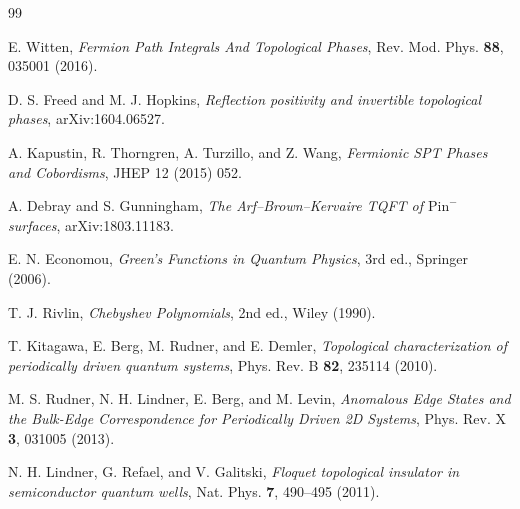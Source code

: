 \documentclass[aps,prb,twocolumn,superscriptaddress,nofootinbib,10pt]{revtex4-2}
\theoremstyle{definition}
\theoremstyle{remark}
\newcommand{\Pin}{\mathrm{Pin}}
\begin{document}

\begin{thebibliography}{99}

E. Witten, \emph{Fermion Path Integrals And Topological Phases}, Rev. Mod. Phys. \textbf{88}, 035001 (2016).

D. S. Freed and M. J. Hopkins, \emph{Reflection positivity and invertible topological phases}, arXiv:1604.06527.

A. Kapustin, R. Thorngren, A. Turzillo, and Z. Wang, \emph{Fermionic SPT Phases and Cobordisms}, JHEP 12 (2015) 052.

A. Debray and S. Gunningham, \emph{The Arf--Brown--Kervaire TQFT of $\Pin^{-}$ surfaces}, arXiv:1803.11183.

E. N. Economou, \emph{Green's Functions in Quantum Physics}, 3rd ed., Springer (2006).

T. J. Rivlin, \emph{Chebyshev Polynomials}, 2nd ed., Wiley (1990).

T. Kitagawa, E. Berg, M. Rudner, and E. Demler, \emph{Topological characterization of periodically driven quantum systems}, Phys. Rev. B \textbf{82}, 235114 (2010).

M. S. Rudner, N. H. Lindner, E. Berg, and M. Levin, \emph{Anomalous Edge States and the Bulk-Edge Correspondence for Periodically Driven 2D Systems}, Phys. Rev. X \textbf{3}, 031005 (2013).

N. H. Lindner, G. Refael, and V. Galitski, \emph{Floquet topological insulator in semiconductor quantum wells}, Nat. Phys. \textbf{7}, 490–495 (2011).

\end{thebibliography}
\end{document}
